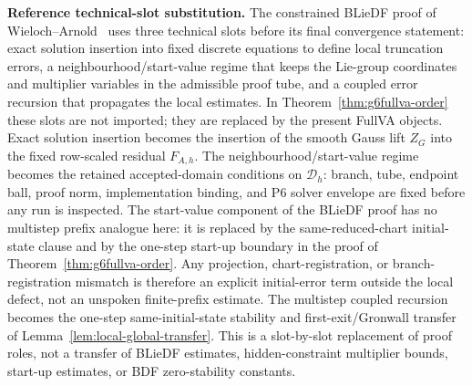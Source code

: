 \documentclass[preprint,12pt]{elsarticle}
\begin{document}
\noindent\textbf{Reference technical-slot substitution.}
The constrained BLieDF proof of Wieloch--Arnold~\cite{wieloch2021bdf}
uses three technical slots before its final convergence statement: exact
solution insertion into fixed discrete equations to define local truncation
errors, a neighbourhood/start-value regime that keeps the Lie-group
coordinates and multiplier variables in the admissible proof tube, and a
coupled error recursion that propagates the local estimates.  In
Theorem~\ref{thm:g6fullva-order} these slots are not imported; they are
replaced by the present FullVA objects.  Exact solution insertion becomes the
insertion of the smooth Gauss lift \(Z_G\) into the fixed row-scaled residual
\(F_{A,h}\).  The neighbourhood/start-value regime becomes the retained
accepted-domain conditions on \(\mathcal D_h\): branch, tube, endpoint ball,
proof norm, implementation binding, and P6 solver envelope are fixed before
any run is inspected.  The start-value component of the BLieDF proof has no
multistep prefix analogue here: it is replaced by the same-reduced-chart
initial-state clause and by the one-step start-up boundary in the proof of
Theorem~\ref{thm:g6fullva-order}.  Any projection, chart-registration, or
branch-registration mismatch is therefore an explicit initial-error term
outside the local defect, not an unspoken finite-prefix estimate.  The
multistep coupled recursion becomes the one-step same-initial-state stability
and first-exit/Gronwall transfer of Lemma~\ref{lem:local-global-transfer}.
This is a slot-by-slot replacement of proof roles, not a transfer of BLieDF
estimates, hidden-constraint multiplier bounds, start-up estimates, or BDF
zero-stability constants.
\end{document}
